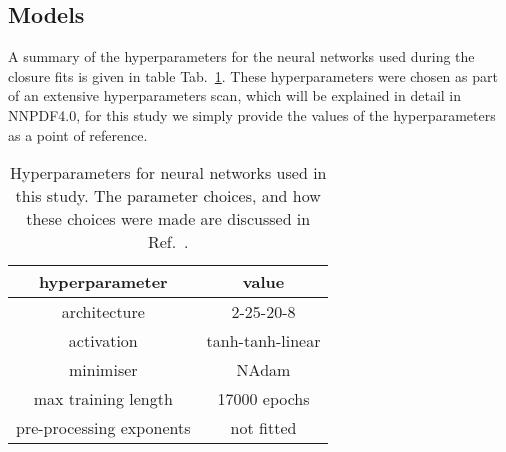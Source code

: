 \subsection{Models}

A summary of the hyperparameters for the neural networks used during the closure
fits is given in table Tab.~\ref{tab:Hyperparams}. These hyperparameters were
chosen as part of an extensive hyperparameters scan, which will be explained in
detail in NNPDF4.0, for this study we simply provide the values of the
hyperparameters as a point of reference.

\begin{table}
    \begin{center}
        \begin{tabular}[h]{c|c}
            \toprule
            hyperparameter & value \\
            \midrule
            architecture & 2-25-20-8 \\
            activation & tanh-tanh-linear \\
            minimiser & NAdam \\
            max training length & 17000 epochs \\
            pre-processing exponents & not fitted \\
            \bottomrule
        \end{tabular}
    \end{center}
    \caption{Hyperparameters for neural networks used in this study. The parameter
    choices, and how these choices were made are discussed in Ref.~\cite{NNPDF40}.}
    \label{tab:Hyperparams}
\end{table}